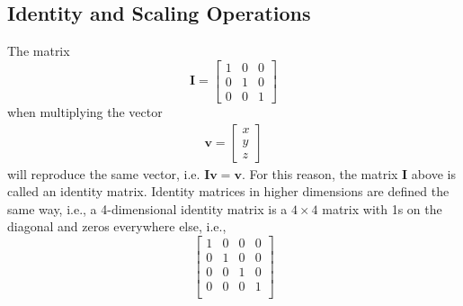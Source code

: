\subsection{Identity and Scaling Operations}
The matrix
\begin{equation}
\mathbf{I} = \left[ \begin{array}{ccc}
   1 & 0 & 0 \\
   0 & 1 & 0 \\
   0 & 0 & 1
 \end{array} \right]
\end{equation}
when multiplying the vector
\begin{align}
\mathbf{v} = \begin{bmatrix}
x\\y\\z
\end{bmatrix}
\end{align}
will reproduce the same vector, i.e. $\mathbf{I} \mathbf{v} = \mathbf{v}$.  For this reason, the matrix $\mathbf{I}$ above is called an identity matrix. Identity matrices in higher dimensions are defined the same way, i.e., a 4-dimensional identity matrix is a $4\times 4$ matrix with 1s on the diagonal and zeros everywhere else, i.e.,
\begin{equation}
 \left[ \begin{array}{cccc}
   1 & 0 & 0 & 0 \\
   0 & 1 & 0 & 0\\
   0 & 0 & 1 & 0 \\
   0 & 0 & 0 & 1 \\
 \end{array} \right]
\end{equation}

